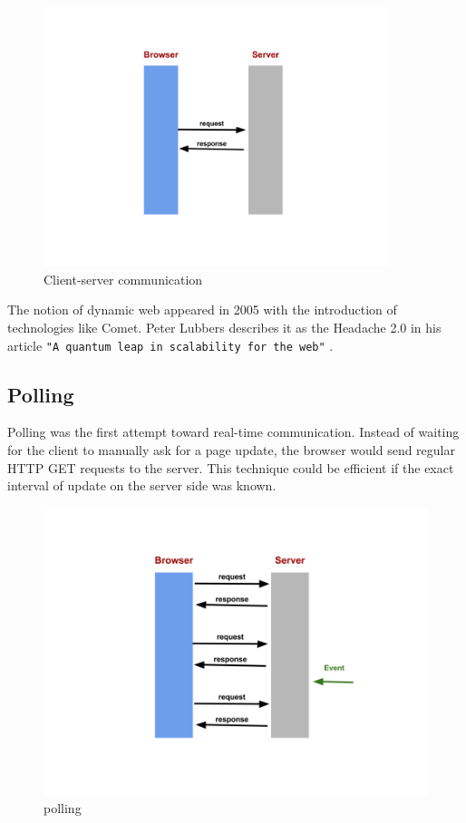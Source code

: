 \begin{figure}[H]
\centering
\includegraphics[width=0.9\textwidth]{./Figures/client_server_communication.png}
\caption[Client-server communication]{Client-server communication}
\label{fig:client_server_communication}
\end{figure}

The notion of dynamic web appeared in 2005 with the introduction of technologies
like Comet. Peter Lubbers describes it as the Headache 2.0 in his article
\texttt{"A quantum leap in scalability for the web"} \citep{Reference32}.

\subsection{Polling}

Polling was the first attempt toward real-time communication. Instead of waiting
for the client to manually ask for a page update, the browser would send regular
HTTP GET requests to the server. This technique could be efficient if the exact
interval of update on the server side was known.

\begin{figure}[H]
\centering
\includegraphics[width=\textwidth]{./Figures/polling.png}
\caption[Polling]{polling}
\label{fig:polling}
\end{figure}

